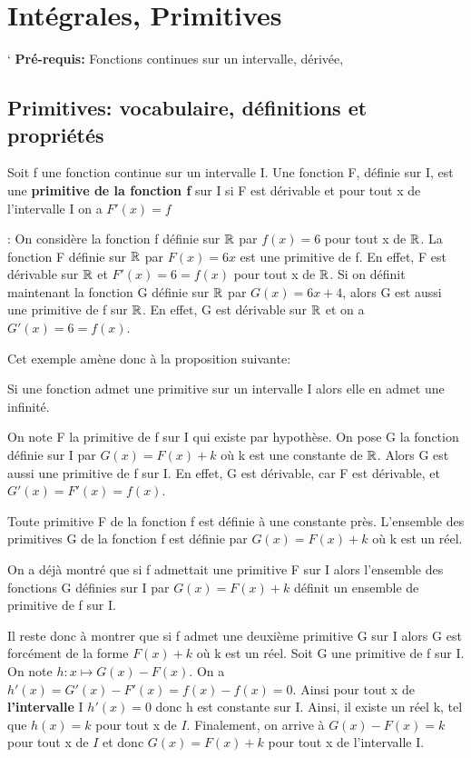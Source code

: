 \chapter{Intégrales, Primitives}
`
\textbf{Pré-requis: } Fonctions continues sur un intervalle, dérivée, 

\section{Primitives: vocabulaire, définitions et propriétés}
\begin{mydef}
  Soit f une fonction continue sur un intervalle I. Une fonction F,
  définie sur I, est une \textbf{primitive de la fonction f} sur I si
  F est dérivable et pour tout x de l'intervalle I on a $F'(x) = f$
\end{mydef}

\exemple{}: On considère la fonction f définie sur $\mathbb{R}$ par $f(x) = 6$
pour tout x de $\mathbb{R}$. La fonction F définie sur $\mathbb{R}$ par $F(x) = 6x$
est une primitive de f. En effet, F est dérivable sur $\mathbb{R}$ et $F'(x) =
6 = f(x)$ pour tout x de $\mathbb{R}$. Si on définit maintenant la fonction G
définie sur $\mathbb{R}$ par $G(x) = 6x + 4$, alors G est aussi une primitive
de f sur $\mathbb{R}$. En effet, G est dérivable sur $\mathbb{R}$ et on a $G'(x) = 6 =
f(x)$.

Cet exemple amène donc à la proposition suivante:

\begin{prop}
  Si une fonction admet une primitive sur un
  intervalle I alors elle en admet une infinité.
\end{prop}

\begin{Proof}
  On note F la primitive de f sur I qui existe par hypothèse. On pose
  G la fonction définie sur I par $G(x) = F(x) + k $ où k est une
  constante de $\mathbb{R}$. Alors G est aussi une primitive de f sur I. En
  effet, G est dérivable, car F est dérivable, et $G'(x) = F'(x) =
  f(x)$. 
\end{Proof}

\begin{Rem}
  Toute primitive F de la fonction f est définie à une constante
  près. L'ensemble des primitives G de la fonction f est définie par
  $G(x) = F(x) + k$ où k est un réel. 
\end{Rem}

\begin{Proof}
  On a déjà montré que si f admettait une primitive F sur I alors
  l'ensemble des fonctions G définies sur I par $G(x) = F(x) + k$
  définit un ensemble de primitive de f sur I.

  Il reste donc à montrer que si f admet une deuxième primitive G sur
  I alors G est forcément de la forme $F(x) + k$ où k est un réel.
  Soit G une primitive de f sur I. On note $h:x \mapsto G(x) -
  F(x)$. On a $h'(x) = G'(x) - F'(x) = f(x) - f(x) = 0$. Ainsi pour
  tout x de \textbf{l'intervalle} I $h'(x) = 0$ donc h est constante
  sur I. Ainsi, il existe un réel k, tel que $h(x) = k$ pour tout x de
  $I$. Finalement, on arrive à $G(x) - F(x) = k $ pour tout x de $I$
  et donc $G(x) = F(x) +k$ pour tout x de l'intervalle I.
\end{Proof}

